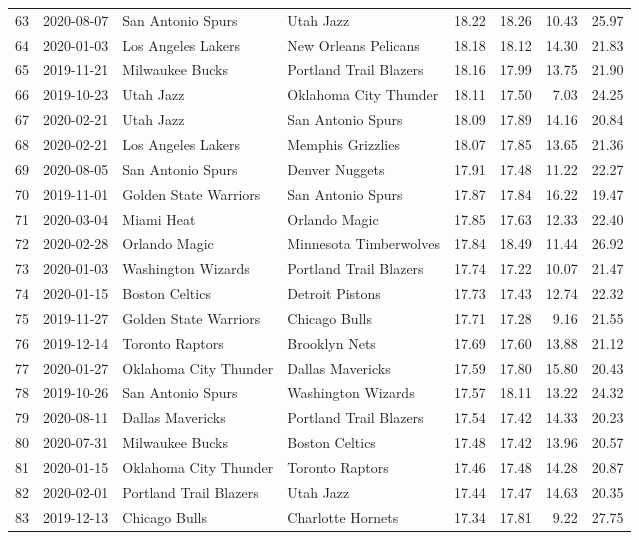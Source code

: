 \documentclass[
  11pt,
]{article}
\theoremstyle{nonumberplain}
\begin{document}
\begin{longtable}{rl|llr|rrr}
63 & 2020-08-07 & San Antonio Spurs & Utah Jazz & 18.22 & 18.26 & 10.43 & 25.97\\
64 & 2020-01-03 & Los Angeles Lakers & New Orleans Pelicans & 18.18 & 18.12 & 14.30 & 21.83\\
65 & 2019-11-21 & Milwaukee Bucks & Portland Trail Blazers & 18.16 & 17.99 & 13.75 & 21.90\\
66 & 2019-10-23 & Utah Jazz & Oklahoma City Thunder & 18.11 & 17.50 & 7.03 & 24.25\\
67 & 2020-02-21 & Utah Jazz & San Antonio Spurs & 18.09 & 17.89 & 14.16 & 20.84\\
68 & 2020-02-21 & Los Angeles Lakers & Memphis Grizzlies & 18.07 & 17.85 & 13.65 & 21.36\\
69 & 2020-08-05 & San Antonio Spurs & Denver Nuggets & 17.91 & 17.48 & 11.22 & 22.27\\
70 & 2019-11-01 & Golden State Warriors & San Antonio Spurs & 17.87 & 17.84 & 16.22 & 19.47\\
71 & 2020-03-04 & Miami Heat & Orlando Magic & 17.85 & 17.63 & 12.33 & 22.40\\
72 & 2020-02-28 & Orlando Magic & Minnesota Timberwolves & 17.84 & 18.49 & 11.44 & 26.92\\
73 & 2020-01-03 & Washington Wizards & Portland Trail Blazers & 17.74 & 17.22 & 10.07 & 21.47\\
74 & 2020-01-15 & Boston Celtics & Detroit Pistons & 17.73 & 17.43 & 12.74 & 22.32\\
75 & 2019-11-27 & Golden State Warriors & Chicago Bulls & 17.71 & 17.28 & 9.16 & 21.55\\
76 & 2019-12-14 & Toronto Raptors & Brooklyn Nets & 17.69 & 17.60 & 13.88 & 21.12\\
77 & 2020-01-27 & Oklahoma City Thunder & Dallas Mavericks & 17.59 & 17.80 & 15.80 & 20.43\\
78 & 2019-10-26 & San Antonio Spurs & Washington Wizards & 17.57 & 18.11 & 13.22 & 24.32\\
79 & 2020-08-11 & Dallas Mavericks & Portland Trail Blazers & 17.54 & 17.42 & 14.33 & 20.23\\
80 & 2020-07-31 & Milwaukee Bucks & Boston Celtics & 17.48 & 17.42 & 13.96 & 20.57\\
81 & 2020-01-15 & Oklahoma City Thunder & Toronto Raptors & 17.46 & 17.48 & 14.28 & 20.87\\
82 & 2020-02-01 & Portland Trail Blazers & Utah Jazz & 17.44 & 17.47 & 14.63 & 20.35\\
83 & 2019-12-13 & Chicago Bulls & Charlotte Hornets & 17.34 & 17.81 & 9.22 & 27.75\\

\end{longtable}
\end{document}
